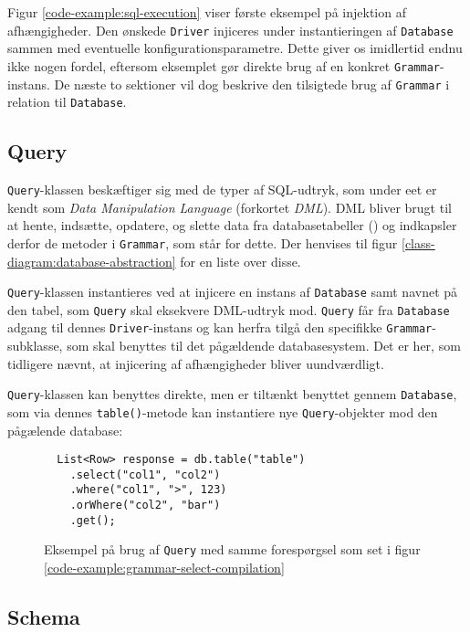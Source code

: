 Figur \ref{code-example:sql-execution} viser første eksempel på injektion af afhængigheder. Den ønskede \texttt{Driver} injiceres under instantieringen af \texttt{Database} sammen med eventuelle konfigurationsparametre. Dette giver os imidlertid endnu ikke nogen fordel, eftersom eksemplet gør direkte brug af en konkret \texttt{Grammar}-instans. De næste to sektioner vil dog beskrive den tilsigtede brug af \texttt{Grammar} i relation til \texttt{Database}.

\subsection{Query}

\texttt{Query}-klassen beskæftiger sig med de typer af SQL-udtryk, som under eet er kendt som \textit{Data Manipulation Language} (forkortet \textit{DML}). DML bliver brugt til at hente, indsætte, opdatere, og slette data fra databasetabeller (\cite{wiki:dml}) og indkapsler derfor de metoder i \texttt{Grammar}, som står for dette. Der henvises til figur \ref{class-diagram:database-abstraction} for en liste over disse.

\texttt{Query}-klassen instantieres ved at injicere en instans af \texttt{Database} samt navnet på den tabel, som \texttt{Query} skal eksekvere DML-udtryk mod. \texttt{Query} får fra \texttt{Database} adgang til dennes \texttt{Driver}-instans og kan herfra tilgå den specifikke \texttt{Grammar}-subklasse, som skal benyttes til det pågældende databasesystem. Det er her, som tidligere nævnt, at injicering af afhængigheder bliver uundværdligt.

\texttt{Query}-klassen kan benyttes direkte, men er tiltænkt benyttet gennem \texttt{Database}, som via dennes \texttt{table()}-metode kan instantiere nye \texttt{Query}-objekter mod den pågælende database:

\begin{figure}[h]
  \begin{verbatim}
  List<Row> response = db.table("table")
    .select("col1", "col2")
    .where("col1", ">", 123)
    .orWhere("col2", "bar")
    .get();
  \end{verbatim}
  \caption{Eksempel på brug af \texttt{Query} med samme forespørgsel som set i figur \ref{code-example:grammar-select-compilation}}
  \label{code-example:query-select}
\end{figure}

\subsection{Schema}

